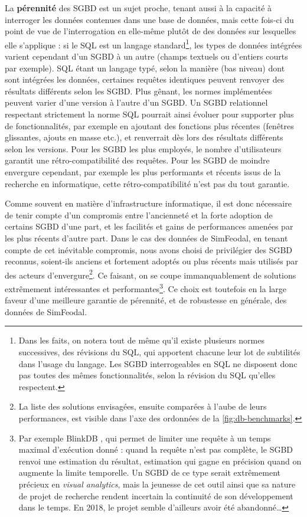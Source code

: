 La \textbf{pérennité} des SGBD est un sujet proche, tenant aussi à la capacité à interroger les données contenues dans une base de données, mais cette fois-ci du point de vue de l'interrogation en elle-même plutôt de des données sur lesquelles elle s'applique :
si le SQL est un langage standard\footnote{
	Dans les faits, on notera tout de même qu'il existe plusieurs normes successives, des \og révisions\fg{} du SQL, qui apportent chacune leur lot de subtilités dans l'usage du langage.
	Les SGBD interrogeables en SQL ne disposent donc pas toutes des mêmes fonctionnalités, selon la révision du SQL qu'elles respectent.
}, les types de données intégrées varient cependant d'un SGBD à un autre (champs textuels ou d'entiers \og courts\fg{} par exemple).
SQL étant un langage typé, selon la manière (bas niveau) dont sont intégrées les données, certaines requêtes identiques peuvent renvoyer des résultats différents selon les SGBD.
Plus gênant, les normes implémentées peuvent varier d'une version à l'autre d'un SGBD.
Un SGBD relationnel respectant strictement la norme SQL pourrait ainsi évoluer pour supporter plus de fonctionnalités, par exemple en ajoutant des fonctions plus récentes (fenêtres glissantes, ajouts en masse etc.), et renverrait dès lors des résultats différents selon les versions.
Pour les SGBD les plus employés, le nombre d'utilisateurs garantit une rétro-compatibilité des requêtes.
Pour les SGBD de moindre envergure cependant, par exemple les plus performants et récents issus de la recherche en informatique, cette rétro-compatibilité n'est pas du tout garantie.

Comme souvent en matière d'infrastructure informatique, il est donc nécessaire de tenir compte d'un compromis entre l'ancienneté et la forte adoption de certains SGBD d'une part, et les facilités et gains de performances amenées par les plus récents d'autre part.
Dans le cas des données de SimFeodal, en tenant compte de cet inévitable compromis, nous avons choisi de privilégier des SGBD reconnus, soient-ils anciens et fortement adoptés ou plus récents mais utilisés par des acteurs d'envergure\footnote{
	La liste des solutions envisagées, ensuite comparées à l'aube de leurs performances, est visible dans l'axe des ordonnées de la \cref{fig:db-benchmarks}.
}.
Ce faisant, on se coupe immanquablement de solutions extrêmement intéressantes et performantes\footnote{
	Par exemple BlinkDB \autocite{agarwal_blinkdb_2013}, qui permet de limiter une requête à un temps maximal d'exécution donné : quand la requête n'est pas complète, le SGBD renvoi une estimation du résultat, estimation qui gagne en précision quand on augmente la limite temporelle.
	Un SGBD de ce type serait extrêmement précieux en \textit{visual analytics}, mais la jeunesse de cet outil ainsi que sa nature de projet de recherche rendent incertain la continuité de son développement dans le temps.
	En 2018, le projet semble d'ailleurs avoir été abandonné\ldots
}.
Ce choix est toutefois en la large faveur d'une meilleure garantie de pérennité, et de robustesse en générale, des données de SimFeodal.

